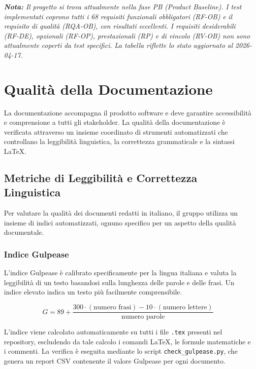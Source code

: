 \documentclass[a4paper,11pt,oneside]{scrartcl}
\begin{document}
\vspace{0.3cm}
\noindent\textit{\textbf{Nota:} Il progetto si trova attualmente nella fase PB (Product Baseline). I test implementati coprono tutti i 68 requisiti funzionali obbligatori (RF-OB) e il requisito di qualità (RQA-OB), con risultati eccellenti. I requisiti desiderabili (RF-DE), opzionali (RF-OP), prestazionali (RP) e di vincolo (RV-OB) non sono attualmente coperti da test specifici. La tabella riflette lo stato aggiornato al 2026-04-17.}

\newpage
\section{Qualità della Documentazione}

La documentazione accompagna il prodotto software e deve garantire accessibilità e comprensione a tutti gli stakeholder{\scriptsize{}}. La qualità della documentazione è verificata attraverso un insieme coordinato di strumenti automatizzati che controllano la leggibilità linguistica, la correttezza grammaticale e la sintassi \LaTeX.

\subsection{Metriche di Leggibilità e Correttezza Linguistica}

Per valutare la qualità dei documenti redatti in italiano, il gruppo utilizza un insieme di indici automatizzati, ognuno specifico per un aspetto della qualità documentale.

\subsubsection{Indice Gulpease}

L'indice Gulpease{\scriptsize{}} è calibrato specificamente per la lingua italiana e valuta la leggibilità di un testo basandosi sulla lunghezza delle parole e delle frasi. Un indice elevato indica un testo più facilmente comprensibile.

\[
    G = 89 + \frac{300 \cdot (\text{numero frasi}) - 10 \cdot (\text{numero lettere})}{\text{numero parole}}
\]

L'indice viene calcolato automaticamente su tutti i file \texttt{.tex} presenti nel repository{\scriptsize{}}, escludendo da tale calcolo i comandi \LaTeX{}{\scriptsize{}}, le formule matematiche e i commenti. La verifica è eseguita mediante lo script \texttt{check\_gulpease.py}, che genera un report CSV contenente il valore Gulpease per ogni documento.
\end{document}
